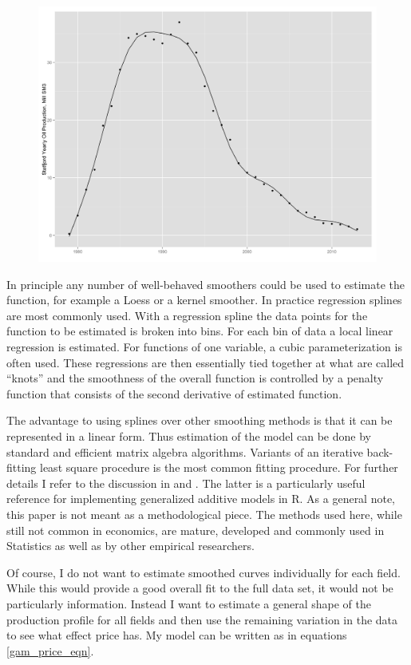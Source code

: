 \documentclass[12pt]{scrartcl} %
\begin{document}
\begin{figure}
	\includegraphics[width=.8\textwidth]{statfjord_gam.png}
	\caption{}
	\label{statfjord_gam}
\end{figure}

In principle any number of well-behaved smoothers could be used to estimate the function, for example a Loess or a kernel smoother.  In practice regression splines are most commonly used.  With a regression spline the data points for the function to be estimated is broken into bins.  For each bin of data a local linear regression is estimated.  For functions of one variable, a cubic parameterization is often used.  These regressions are then essentially tied together at what are called “knots” and the smoothness of the overall function is controlled by a penalty function that consists of the second derivative of estimated function.

The advantage to using splines over other smoothing methods is that it can be represented in a linear form.  Thus estimation of the model can be done by standard and efficient matrix algebra algorithms.  Variants of an iterative back-fitting least square procedure is the most common fitting procedure.  For further details I refer to the discussion in \citet{hastie_generalized_1990} and \citet{wood_generalized_2006}.  The latter is a particularly useful reference for implementing generalized additive models in R.  As a general note, this paper is not meant as a methodological piece.  The methods used here, while still not common in economics, are mature, developed and commonly used in Statistics as well as by other empirical researchers.

Of course, I do not want to estimate smoothed curves individually for each field.  While this would provide a good overall fit to the full data set, it would not be particularly information.  Instead I want to estimate a general shape of the production profile for all fields and then use the remaining variation in the data to see what effect price has.  My model can be written as in equations \ref{gam_price_eqn}.
\end{document}
